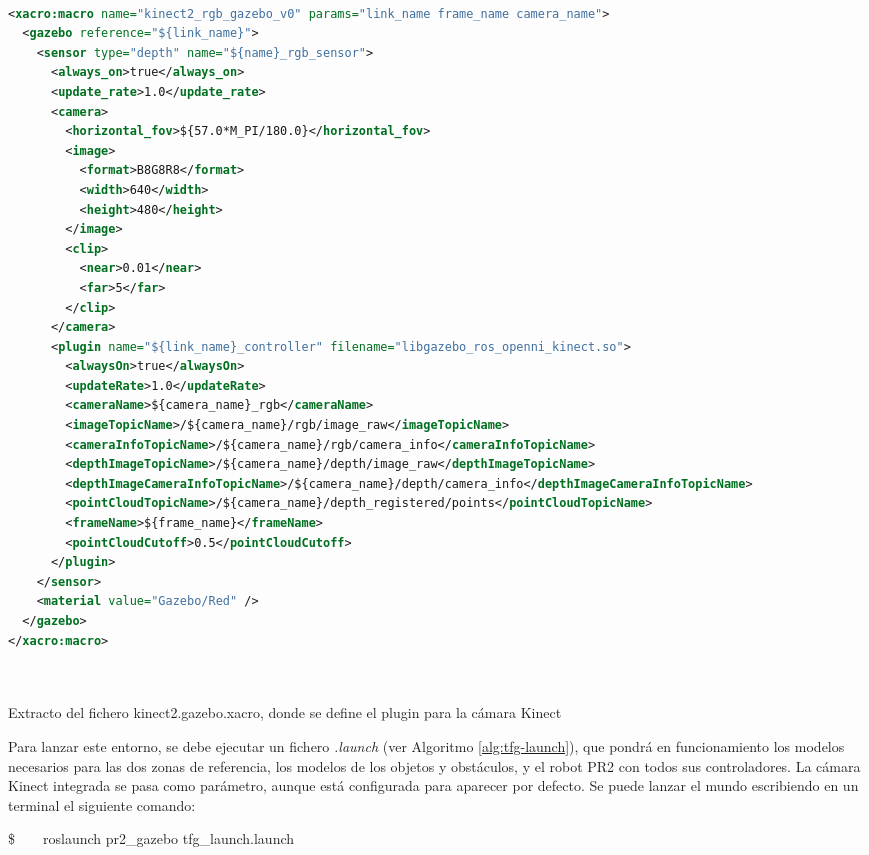 \documentclass[12pt,spanish,chapterprefix, numbers=noenddot]{book}
\numberwithin{equation}{section}
\numberwithin{figure}{section}
\begin{document}
\begin{algorithm}[htbp!]
	\begin{lstlisting}[breaklines=true,language=xml]    

<xacro:macro name="kinect2_rgb_gazebo_v0" params="link_name frame_name camera_name">
  <gazebo reference="${link_name}">
    <sensor type="depth" name="${name}_rgb_sensor">
      <always_on>true</always_on>
      <update_rate>1.0</update_rate>
      <camera>
        <horizontal_fov>${57.0*M_PI/180.0}</horizontal_fov>
        <image>
          <format>B8G8R8</format>
          <width>640</width>
          <height>480</height>
        </image>
        <clip>
          <near>0.01</near>
          <far>5</far>
        </clip>
      </camera>
      <plugin name="${link_name}_controller" filename="libgazebo_ros_openni_kinect.so">
        <alwaysOn>true</alwaysOn>
        <updateRate>1.0</updateRate>
        <cameraName>${camera_name}_rgb</cameraName>
        <imageTopicName>/${camera_name}/rgb/image_raw</imageTopicName>
        <cameraInfoTopicName>/${camera_name}/rgb/camera_info</cameraInfoTopicName>
        <depthImageTopicName>/${camera_name}/depth/image_raw</depthImageTopicName>
        <depthImageCameraInfoTopicName>/${camera_name}/depth/camera_info</depthImageCameraInfoTopicName>
        <pointCloudTopicName>/${camera_name}/depth_registered/points</pointCloudTopicName>
        <frameName>${frame_name}</frameName>
        <pointCloudCutoff>0.5</pointCloudCutoff>
      </plugin>
    </sensor>
    <material value="Gazebo/Red" />
  </gazebo>
</xacro:macro>
         
         
	\end{lstlisting}
\caption{\label{alg:kinect2-xacro}Extracto del fichero kinect2.gazebo.xacro, donde se define el plugin para la cámara Kinect}
\end{algorithm}

Para lanzar este entorno, se debe ejecutar un fichero \textit{.launch} (ver Algoritmo \ref{alg:tfg-launch}), que pondrá en funcionamiento los modelos necesarios para las dos zonas de referencia, los modelos de los objetos y obstáculos, y el robot PR2 con todos sus controladores. La cámara Kinect integrada se pasa como parámetro, aunque está configurada para aparecer por defecto. Se puede lanzar el mundo escribiendo en un terminal el siguiente comando:

\$\ \ \ \ roslaunch pr2\_gazebo tfg\_launch.launch
\end{document}
